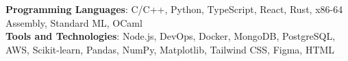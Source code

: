 \begin{itemize}[leftmargin=0in, label={}]
    \footnotesize{\item{
     \textbf{Programming Languages}{:  C/C++, Python, TypeScript, React,
     Rust, x86-64 Assembly, Standard ML, OCaml} \\
     \textbf{Tools and Technologies}{: Node.js, DevOps, Docker, MongoDB,
     PostgreSQL, AWS, Scikit-learn, Pandas, NumPy, Matplotlib, Tailwind
     CSS, Figma, HTML} \\
    }}
\end{itemize}